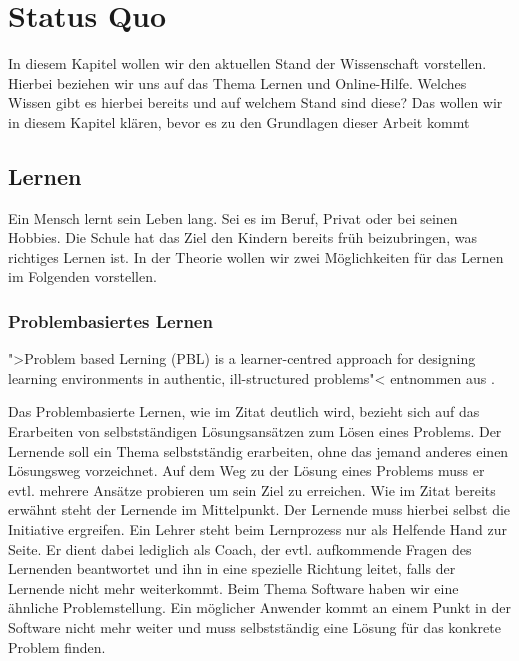 
\chapter{Status Quo}
In diesem Kapitel wollen wir den aktuellen Stand der Wissenschaft vorstellen. Hierbei beziehen wir uns auf das Thema Lernen und Online-Hilfe. Welches Wissen gibt es hierbei bereits und auf welchem Stand sind diese? Das wollen wir in diesem Kapitel klären, bevor es zu den Grundlagen dieser Arbeit kommt

\section{Lernen}
Ein Mensch lernt sein Leben lang. Sei es im Beruf, Privat oder bei seinen Hobbies. Die Schule hat das Ziel den Kindern bereits früh beizubringen, was richtiges Lernen ist. In der Theorie wollen wir zwei Möglichkeiten für das Lernen im Folgenden vorstellen.

\subsection{Problembasiertes Lernen}
">Problem based Lerning (PBL) is a learner-centred approach for designing learning environments in authentic, ill-structured problems"< entnommen aus \cite{zumbachproblembasiertes}. \par

Das Problembasierte Lernen, wie im Zitat deutlich wird, bezieht sich auf das Erarbeiten von selbstständigen Lösungsansätzen zum Lösen eines Problems. Der Lernende soll ein Thema selbstständig erarbeiten, ohne das jemand anderes einen Lösungsweg vorzeichnet. Auf dem Weg zu der Lösung eines Problems muss er evtl. mehrere Ansätze probieren um sein Ziel zu erreichen. Wie im Zitat bereits erwähnt steht der Lernende im Mittelpunkt. Der Lernende muss hierbei selbst die Initiative ergreifen. Ein Lehrer steht beim Lernprozess nur als Helfende Hand zur Seite. Er dient dabei lediglich als Coach, der evtl. aufkommende Fragen des Lernenden beantwortet und ihn in eine spezielle Richtung leitet, falls der Lernende nicht mehr weiterkommt. Beim Thema Software haben wir eine ähnliche Problemstellung. Ein möglicher Anwender kommt an einem Punkt in der Software nicht mehr weiter und muss selbstständig eine Lösung für das konkrete Problem finden. 
 

